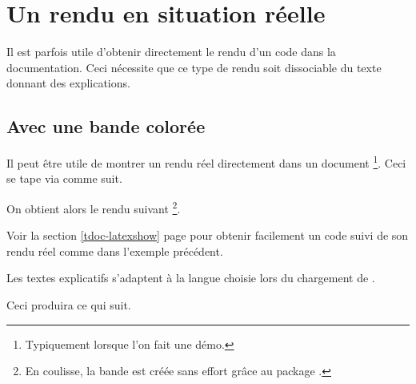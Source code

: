 \documentclass[10pt, a4paper]{article}
\begin{document}
\section{Un rendu en situation réelle} \label{tdoc-showcase}

Il est parfois utile d'obtenir directement le rendu d'un code dans la documentation. Ceci nécessite que ce type de rendu soit dissociable du texte donnant des explications.




\subsection{Avec une bande colorée}

\begin{tdocexa}
    Il peut être utile de montrer un rendu réel directement dans un document
    \footnote{
    	Typiquement lorsque l'on fait une démo.
	}.
    Ceci se tape via  comme suit.


    On obtient alors le rendu suivant
    \footnote{
        En coulisse, la bande est créée sans effort grâce au package .
    }.

    \medskip

    
\end{tdocexa}


\begin{tdocrem}
    Voir la section \ref{tdoc-latexshow} page \pageref{tdoc-latexshow} pour obtenir facilement un code suivi de son rendu réel comme dans l'exemple précédent.
\end{tdocrem}

\begin{tdocnote}
    Les textes explicatifs s'adaptent à la langue choisie lors du chargement de .
\end{tdocnote}




\begin{tdocexa}
    \leavevmode


    Ceci produira ce qui suit.

    \medskip

    
\end{tdocexa}
\end{document}

